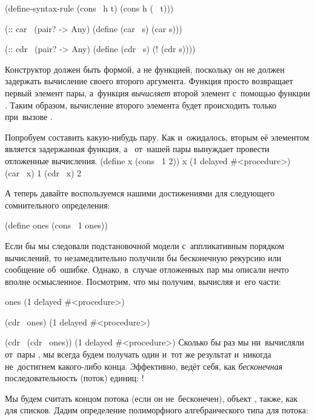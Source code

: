 \newpage
\begin{Definition}[emph={h,t}]
(define-syntax-rule (cons~ h t)
 (cons h (~ t)))

(:: car~ (pair? -> Any)
 (define (car~ s) (car s)))

(:: cdr~ (pair? -> Any)
 (define (cdr~ s) (! (cdr s))))
\end{Definition}

Конструктор  должен быть формой, а не функцией, поскольку он не должен задержать вычисление своего второго аргумента. Функция  просто возвращает первый элемент пары, а~функция  \emph{вычисляет} второй элемент с~помощью функции \s{!}. Таким образом, вычисление второго элемента будет происходить только при~вызове .

\begin{example}{Попробуем составить какую-нибудь пару. Как и~ожидалось, вторым её элементом является задержанная функция, а~ от~нашей пары вынуждает провести отложенные вычисления.}
\REPLin
  {(define x (cons~ 1 2))}
\REPL
  {x}
  {(1 delayed \#<procedure>)}
\REPL
  {(car~ x)}
  {1}
\REPL
  {(cdr~ x)}
  {2}
\end{example}

А теперь давайте воспользуемся нашими достижениями для следующего сомнительного определения:

\begin{Definition}
(define ones (cons~ 1 ones))
\end{Definition}

Если бы мы следовали подстановочной модели с~аппликативным порядком вычислений, то незамедлительно получили бы бесконечную рекурсию или сообщение об~ошибке. Однако, в~случае отложенных пар мы описали нечто вполне осмысленное. Посмотрим, что мы получим, вычисляя  и~его части:

\REPL
  {ones}
  {(1 delayed \#<procedure>)}

\REPL
  {(cdr~ ones)}
  {(1 delayed \#<procedure>)}

\REPL
  {(cdr~ (cdr~ ones))}
  {(1 delayed \#<procedure>)}
\newpage%
\noindent%
Сколько бы раз мы ни~вычисляли  от~пары , мы всегда будем получать один и~тот же результат и~никогда не~достигнем какого-либо конца. Эффективно,  ведёт себя, как \emph{бесконечная} последовательность (поток) единиц: !

Мы будем считать концом потока (если он не~бесконечен), объект , также, как для списков. Дадим определение полиморфного алгебраического типа для потока:

